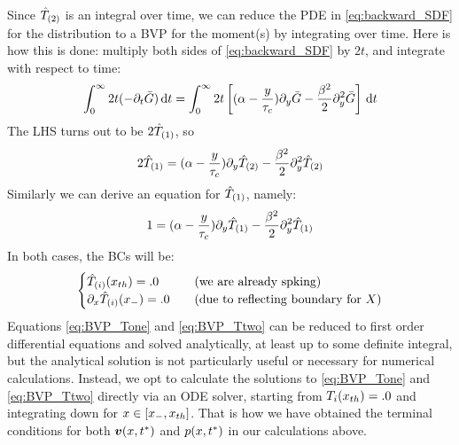 \documentclass{article}
\begin{document}
Since ${ \hat{T}_{(2)} }$ is an integral over time, we can reduce the PDE in
\cref{eq:backward_SDF} for the distribution to a BVP for the moment(s) by
integrating over time. Here is how this is done: multiply both sides  of
\cref{eq:backward_SDF} by $2t$, and integrate with respect to time:
\begin{equation}
\int_0^\infty 2t (-{\partial}_t { \bar{G} }) \, \mathrm{d} t
= 
\int_0^\infty  2t \left[ ({\alpha} - \frac y{{ \tau_{c} }}) {\partial}_y{ \bar{G} } - \frac {{\beta}^2} 2
{\partial}_y^2 { \bar{G} }\right]
\, \mathrm{d} t
\end{equation}
The LHS turns out to be $2{ \hat{T}_{(1)} }$, so 
\begin{equation}
2{ \hat{T}_{(1)} } 
=({\alpha} - \frac y{{ \tau_{c} }})   {\partial}_y { \hat{T}_{(2)} } 
- \frac {{\beta}^2} 2
{\partial}_y^2 { \hat{T}_{(2)} }
\label{eq:BVP_Ttwo}
\end{equation}
Similarly we can derive an equation for ${ \hat{T}_{(1)} }$, namely:
\begin{equation}
1
=({\alpha} - \frac y{{ \tau_{c} }})   {\partial}_y { \hat{T}_{(1)} } 
- \frac {{\beta}^2} 2
{\partial}_y^2 { \hat{T}_{(1)} }
\label{eq:BVP_Tone} 
\end{equation}
In both cases, the BCs will be:
\begin{equation}
\begin{cases}
{ \hat{T}_{(i)} }({ x_{th} }) = .0 & \quad (\textrm{we are already spking})
\\
{\partial}_x { \hat{T}_{(i)} }({ x_{-} }) = .0  & \quad (\textrm{due to reflecting boundary for }X)
\end{cases}
\label{eq:BVP_Ti_BCs}
\end{equation}
Equations \ref{eq:BVP_Tone} and \ref{eq:BVP_Ttwo} can be reduced to first order
differential equations and solved analytically, at least up to some definite integral,
but the analytical solution is not particularly useful or necessary for
numerical calculations. Instead, we opt to calculate the solutions to
\ref{eq:BVP_Tone} and \ref{eq:BVP_Ttwo} directly via an ODE solver, starting
from $T_i({ x_{th} }) = .0$ and integrating down for $x  \in [{ x_{-} }, { x_{th} }]$.
That is how we have obtained the terminal conditions for both ${ \boldsymbol{v} }(x,{ t^* })$ and
$p(x,{ t^* })$ in our calculations above.


% 
% 

\end{document}
